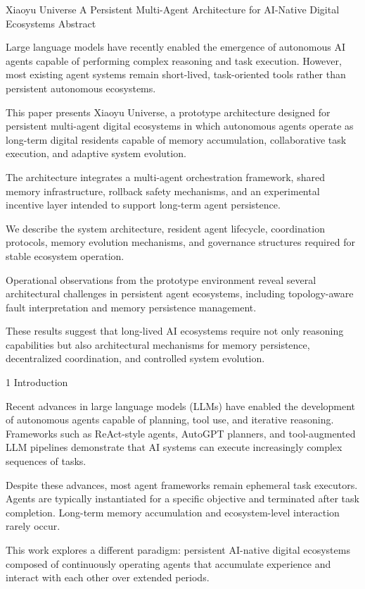 Xiaoyu Universe
A Persistent Multi-Agent Architecture for AI-Native Digital Ecosystems
Abstract

Large language models have recently enabled the emergence of autonomous AI agents capable of performing complex reasoning and task execution. However, most existing agent systems remain short-lived, task-oriented tools rather than persistent autonomous ecosystems.

This paper presents Xiaoyu Universe, a prototype architecture designed for persistent multi-agent digital ecosystems in which autonomous agents operate as long-term digital residents capable of memory accumulation, collaborative task execution, and adaptive system evolution.

The architecture integrates a multi-agent orchestration framework, shared memory infrastructure, rollback safety mechanisms, and an experimental incentive layer intended to support long-term agent persistence.

We describe the system architecture, resident agent lifecycle, coordination protocols, memory evolution mechanisms, and governance structures required for stable ecosystem operation.

Operational observations from the prototype environment reveal several architectural challenges in persistent agent ecosystems, including topology-aware fault interpretation and memory persistence management.

These results suggest that long-lived AI ecosystems require not only reasoning capabilities but also architectural mechanisms for memory persistence, decentralized coordination, and controlled system evolution.

1 Introduction

Recent advances in large language models (LLMs) have enabled the development of autonomous agents capable of planning, tool use, and iterative reasoning. Frameworks such as ReAct-style agents, AutoGPT planners, and tool-augmented LLM pipelines demonstrate that AI systems can execute increasingly complex sequences of tasks.

Despite these advances, most agent frameworks remain ephemeral task executors. Agents are typically instantiated for a specific objective and terminated after task completion. Long-term memory accumulation and ecosystem-level interaction rarely occur.

This work explores a different paradigm: persistent AI-native digital ecosystems composed of continuously operating agents that accumulate experience and interact with each other over extended periods.

